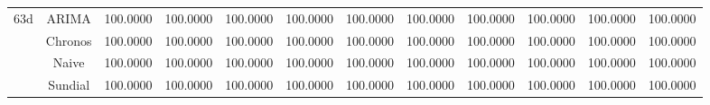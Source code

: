 \begin{table}[h!]
{\begin{tabular}{cccccccccccc}
\midrule
\multirow[c]{4}{*}{63d} & ARIMA & 100.0000 & 100.0000 & 100.0000 & 100.0000 & 100.0000 & 100.0000 & 100.0000 & 100.0000 & 100.0000 & 100.0000 \\
 & Chronos & 100.0000 & 100.0000 & 100.0000 & 100.0000 & 100.0000 & 100.0000 & 100.0000 & 100.0000 & 100.0000 & 100.0000 \\
 & Naive & 100.0000 & 100.0000 & 100.0000 & 100.0000 & 100.0000 & 100.0000 & 100.0000 & 100.0000 & 100.0000 & 100.0000 \\
 & Sundial & 100.0000 & 100.0000 & 100.0000 & 100.0000 & 100.0000 & 100.0000 & 100.0000 & 100.0000 & 100.0000 & 100.0000 \\
\bottomrule
\end{tabular}

 }
\end{table}